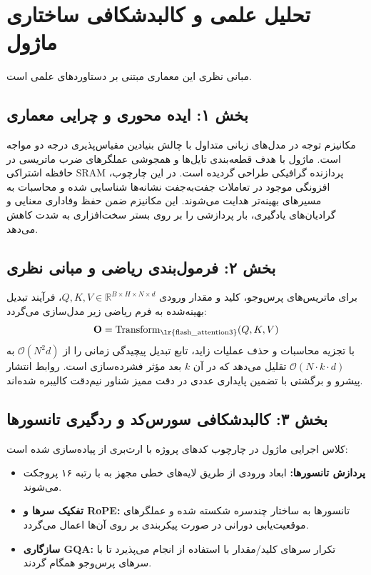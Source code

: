 \section{تحلیل علمی و کالبدشکافی ساختاری ماژول }

مبانی نظری این معماری مبتنی بر دستاوردهای علمی \cite{dao2022flashattention} است.
\label{sec:flash_attention3}

\subsection*{بخش ۱: ایده محوری و چرایی معماری }
مکانیزم توجه در مدل‌های زبانی متداول با چالش بنیادین مقیاس‌پذیری درجه دو مواجه است. ماژول  با هدف قطعه‌بندی تایل‌ها و همجوشی عملگرهای ضرب ماتریسی در حافظه اشتراکی SRAM پردازنده گرافیکی طراحی گردیده است. در این چارچوب، افزونگی موجود در تعاملات جفت‌به‌جفت نشانه‌ها شناسایی شده و محاسبات به مسیرهای بهینه‌تر هدایت می‌شوند. این مکانیزم ضمن حفظ وفاداری معنایی و گرادیان‌های یادگیری، بار پردازشی را بر روی بستر سخت‌افزاری به شدت کاهش می‌دهد.

\subsection*{بخش ۲: فرمول‌بندی ریاضی و مبانی نظری }
برای ماتریس‌های پرس‌وجو، کلید و مقدار ورودی $Q, K, V \in \mathbb{R}^{B \times H \times N \times d}$، فرآیند تبدیل بهینه‌شده به فرم ریاضی زیر مدل‌سازی می‌گردد:
\begin{equation}
\mathbf{O} = \operatorname{Transform}_{\text{\lr{flash\_attention3}}}(Q, K, V)
\end{equation}
با تجزیه محاسبات و حذف عملیات زاید، تابع تبدیل پیچیدگی زمانی را از $\mathcal{O}(N^2 d)$ به $\mathcal{O}(N \cdot k \cdot d)$ تقلیل می‌دهد که در آن $k$ بعد مؤثر فشرده‌سازی است. روابط انتشار پیشرو و برگشتی با تضمین پایداری عددی در دقت ممیز شناور نیم‌دقت  کالیبره شده‌اند.

\subsection*{بخش ۳: کالبدشکافی سورس‌کد و ردگیری تانسورها }
کلاس اجرایی ماژول در چارچوب کدهای پروژه با ارث‌بری از  پیاده‌سازی شده است:
\begin{itemize}
    \item \textbf{پردازش تانسورها:} ابعاد ورودی \lr{$[B, N, D]$} از طریق لایه‌های خطی مجهز به  با رتبه ۱۶ پروجکت می‌شوند.
    \item \textbf{تفکیک سرها و RoPE:} تانسورها به ساختار چندسره \lr{$[B, H, N, d]$} شکسته شده و عملگرهای موقعیت‌یابی دورانی در صورت پیکربندی بر روی آن‌ها اعمال می‌گردد.
    \item \textbf{سازگاری GQA:} تکرار سرهای کلید/مقدار با استفاده از  انجام می‌پذیرد تا با سرهای پرس‌وجو همگام گردند.
\end{itemize}


